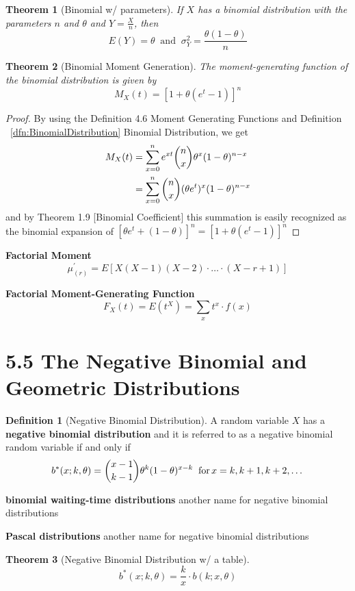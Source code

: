 \documentclass[
10pt,reqno
]{amsart}
\newtheorem{theorem}{Theorem}[section]
\theoremstyle{definition}
\newtheorem{definition}{Definition}[section]
\begin{document}
\begin{theorem}[Binomial w/ parameters]
If \(X\) has a binomial distribution with the parameters \(n\) and \(\theta\) and \(Y=\frac{X}{n}\), then
\[
E(Y)=\theta \;\; \text{and} \;\; \sigma_Y^2 = \frac{\theta(1-\theta)}{n}
\]
\end{theorem}

\begin{theorem}[Binomial Moment Generation]
The moment-generating function of the binomial distribution is given by 
\[
M_X(t) = [1 + \theta(e^t-1)]^n
\]
\end{theorem}

\begin{proof}
By using the Definition 4.6 Moment Generating Functions and Definition ~\ref{dfn:BinomialDistribution} Binomial Distribution, we get 
\begin{align*}
M_X(t)&=\sum_{x=0}^n e^{xt} \dbinom n x \theta^x (1 - \theta)^{n-x}\\
&=\sum_{x=0}^n \dbinom n x (\theta e^t)^x (1 - \theta)^{n-x}
\end{align*}
and by Theorem 1.9 [Binomial Coefficient] this summation is easily recognized as the binomial expansion of \([\theta e^t + (1-\theta)]^n=[1+\theta(e^t - 1)]^n\)
\end{proof}

\textbf{Factorial Moment}
\[
\mu_{(r)}^{'}=E[X(X-1)(X-2)\cdot \ldots \cdot (X-r+1)]
\]

\textbf{Factorial Moment-Generating Function}
\[
F_X(t)=E(t^X) = \sum_x t^x \cdot f(x)
\]

\section*{5.5 The Negative Binomial and Geometric Distributions}

\begin{definition}[Negative Binomial Distribution]
A random variable \(X\) has a \textbf{negative binomial distribution} and it is referred to as a negative binomial random variable if and only if
\[
b^*(x;k,\theta) = \dbinom {x-1} {k-1} \theta^k(1-\theta)^{x-k} \; \; \text{for} \, x=k,k+1,k+2,\dots
\]
\end{definition}

\textbf{binomial waiting-time distributions} another name for negative binomial distributions

\textbf{Pascal distributions} another name for negative binomial distributions

\begin{theorem}[Negative Binomial Distribution w/ a table]
\[
b^*(x;k,\theta)= \frac{k}{x}\cdot b(k;x,\theta)
\]
\end{theorem}
\end{document}

